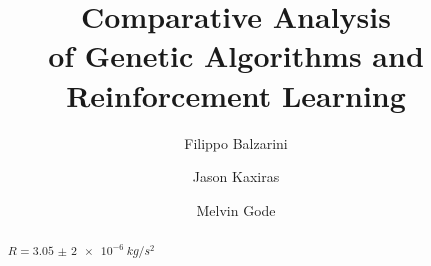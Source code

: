 \begin{frontmatter}
%
\title{%
Comparative Analysis \\ of Genetic Algorithms
and Reinforcement Learning\\
}
%
\author[UppsalaUniversity]{Filippo Balzarini} 
\author[UppsalaUniversity]{Jason Kaxiras}
\author[UppsalaUniversity]{Melvin Gode}
\address[UppsalaUniversity]{Department of Computer Science, Uppsala University, Uppsala, Sweden}
%
%
\renewcommand*{\today}{\MonthYearDateFormat\displaydate{dateName}} 
%
\begin{abstract}

 $R=\SI{3,05(2)e-6}{kg/s^{2}}$

\end{abstract}
%
\end{frontmatter}
%
%
%

